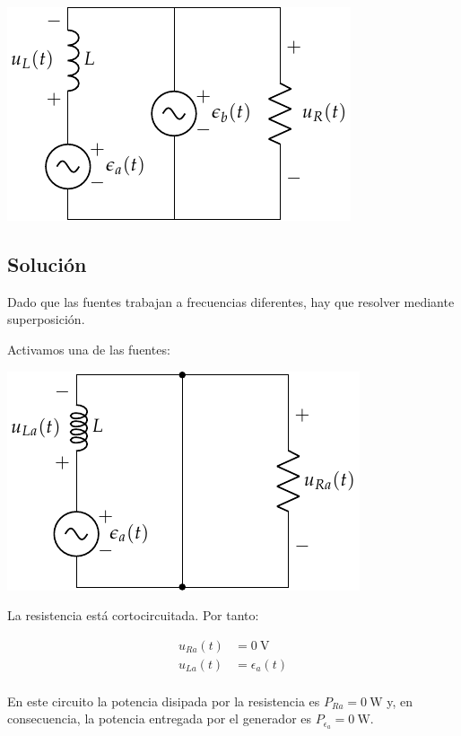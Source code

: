 \begin{center}
  \includegraphics{figuras/superposicion2_ej.pdf}
\end{center}

\subsection*{Solución}

Dado que las fuentes trabajan a frecuencias diferentes, hay que resolver mediante superposición.

Activamos una de las fuentes:
\begin{center}
\includegraphics{figuras/superposicion2_A}
\end{center}

La resistencia está cortocircuitada. Por tanto:

\begin{align*}
  u_{Ra}(t) &= \qty{0}{\volt}\\
  u_{La}(t) &= \epsilon_a(t)\\  
\end{align*}

En este circuito la potencia disipada por la resistencia es $P_{Ra} = \qty{0}{\watt}$ y, en consecuencia, la potencia entregada por el generador es $P_{\epsilon_a} = \qty{0}{\watt}$.

